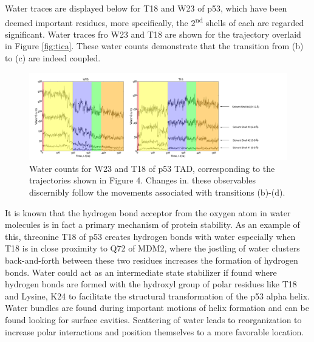 Water traces are displayed below for T18 and W23 of p53, which have been deemed important residues, more specifically, the 2\textsuperscript{nd} shells of each are regarded significant.  Water traces fro W23 and T18 are shown for the trajectory overlaid in Figure \ref{fig:tica}.  These water counts demonstrate that the transition from (b) to (c) are indeed coupled.


\begin{figure}[h!]
\centering
\includegraphics[scale=0.25]{Figures/Water_counts/Water_counts.pdf}
\caption{Water counts for W23 and T18 of p53 TAD,
corresponding to the trajectories shown in Figure 4. Changes in. these
observables discernibly follow the movements associated with transitions
(b)-(d).}
\label{fig:water_counts}
\end{figure}



It is known that the hydrogen bond acceptor from the oxygen atom in water molecules is in fact a primary mechanism of protein stability. As an example of this, threonine T18 of p53 creates hydrogen bonds with water especially when T18 is in close proximity to Q72 of MDM2, where the jostling of water clusters back-and-forth between these two residues increases the formation of hydrogen bonds.  Water could act as an intermediate state stabilizer if found where hydrogen bonds are formed with the hydroxyl group of polar residues like T18 and Lysine, K24 to facilitate the structural transformation of the p53 alpha helix. Water bundles are found during important motions of helix formation and can be found looking for surface cavities. Scattering of water leads to reorganization to increase polar interactions and position themselves to a more favorable location.






